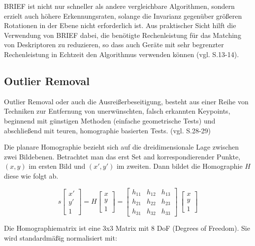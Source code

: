 BRIEF ist nicht nur schneller als andere vergleichbare Algorithmen, sondern erzielt auch höhere Erkennungsraten, solange die Invarianz gegenüber größeren Rotationen in der Ebene nicht erforderlich ist. Aus praktischer Sicht hilft die Verwendung von BRIEF dabei, die benötigte Rechenleistung für das Matching von Deskriptoren zu reduzieren, so dass auch Geräte mit sehr begrenzter Rechenleistung in Echtzeit den Algorithmus verwenden können (vgl. \cite{brief} S.13-14).


\subsection{Outlier Removal}

\glqq Outlier Removal\grqq{} oder auch die Ausreißerbeseitigung, besteht aus einer Reihe von Techniken zur Entfernung von unerwünschten, falsch erkannten Keypoints, beginnend mit günstigen Methoden (einfache geometrische Tests) und abschließend mit teuren, homographie basierten Tests. (vgl. \cite{natural_feature} S.28-29) 


Die planare Homographie bezieht sich auf die dreidimensionale Lage zwischen zwei Bildebenen. Betrachtet man das erst Set and korrespondierender Punkte, $(x,y)$ im ersten Bild und $(x',y')$ im zweiten. Dann bildet die Homographie $H$ diese wie folgt ab.

\begin{equation}
  s  
  		\begin{bmatrix}
		x'\\
		y'\\
		1
     	\end{bmatrix}
     = H
     	\begin{bmatrix}
		x\\
		y\\
		1
     	\end{bmatrix}
      = 
     	\begin{bmatrix}
		h_{11} & h_{12} & h_{13}\\
		h_{21} & h_{22} & h_{23}\\
		h_{31} & h_{32} & h_{33}
     	\end{bmatrix}
      \
     	\begin{bmatrix}
		x\\
		y\\
		1
     	\end{bmatrix}
\end{equation}

Die Homographiematrix ist eine 3x3 Matrix mit 8 DoF (Degrees of Freedom). Sie wird standardmäßig normalisiert mit: 

